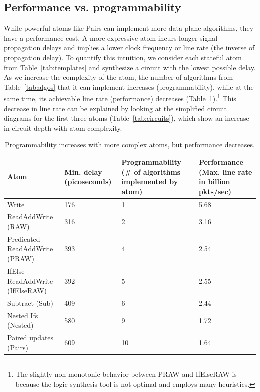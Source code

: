 \subsection{Performance vs. programmability}
\label{ss:perfprog}
While powerful atoms like Pairs can implement more data-plane algorithms, they
have a performance cost.  A more expressive atom incurs longer signal
propagation delays and implies a lower clock frequency or line rate
(the inverse of propagation delay).  To quantify
this intuition, we consider each stateful atom from Table~\ref{tab:templates}
and synthesize a circuit with the lowest possible delay. As we increase the
complexity of the atom, the number of algorithms from Table~\ref{tab:algos}
that it can implement increases (programmability), while at the same time, its
achievable line rate (performance) decreases
(Table~\ref{tab:perfprog}).\footnote{The slightly non-monotonic behavior
between PRAW and IfElseRAW is because the logic synthesis tool is not optimal
and employs many heuristics.} This decrease in line rate can be explained by
looking at the simplified circuit diagrams for the first three atoms
(Table~\ref{tab:circuits}), which show an increase in circuit depth with atom
complexity.

\begin{table}[!t]
  \begin{scriptsize}
  \begin{tabular}{|p{}|p{}|p{}|p{}|}
  \hline
  Atom & Min. delay (picoseconds) & Programmability (\# of algorithms implemented by atom) & Performance (Max. line rate in billion pkts/sec) \\
  \hline
  Write & 176 & 1  & 5.68 \\
  \hline
  ReadAddWrite (RAW) & 316 & 2 & 3.16\\
  \hline
  \pbox{0.1\textwidth}
  {Predicated\\
  ReadAddWrite (PRAW)} & 393 & 4 & 2.54 \\
  \hline
  IfElse ReadAddWrite (IfElseRAW) & 392 & 5 & 2.55 \\
  \hline
  Subtract (Sub) & 409 & 6 & 2.44 \\
  \hline
  Nested Ifs (Nested) & 580 & 9 & 1.72 \\
  \hline
  Paired updates (Pairs) & 609 & 10 & 1.64 \\
  \hline
  \end{tabular}
\end{scriptsize}
\caption{Programmability increases with more complex atoms,
  but performance decreases.}
\label{tab:perfprog}
\end{table}

